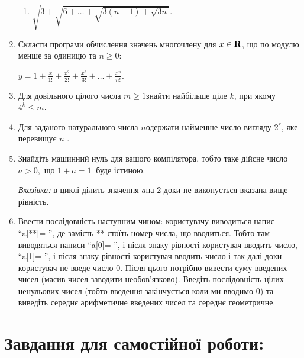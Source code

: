 \documentclass[a5paper,titlepage,openany,twoside,
]
{book_unv}%
\makeatletter
\newcommand{\xslalph}[1]{\expandafter\@xslalph\csname c@#1\endcsname}
\newcommand{\@xslalph}[1]{%
    \ifcase#1\or а\or б\or в\or г\or д\or e\or є\or ж\or з\or i%
    \or й\or к\or л\or м\or н\or о\or п\or р\or с\or т%
    \or у\or ф\or х\or ц\or ч\or ш\or ю\or я\or аа\or бб\or вв%
    \else\@ctrerr\fi%
}
\makeatother
\begin{document}
\begin{enumerate}
\begin{enumerate}[label=\xslalph*)]
\item
 \(\sqrt{3 + \sqrt{6 + \ldots + \sqrt{3(n - 1) + \sqrt{3n}}}}.\)

\end{enumerate}

\item
  Скласти програми обчислення значень многочлену для 
  \(x \in \bf{R}\), що по модулю менше за одиницю та
  \( n \geq 0\):

\(y = 1 + \frac{x}{1!} + \frac{x^{2}}{2!} + \frac{x^{3}}{3!} + \ldots + \frac{x^{n}}{n!} \).

\item
  Для довільного цілого числа \(m \geq 1\)знайти найбільше ціле \(k\),
  при якому \(4^{k} \leq m\).
\item
  Для заданого натурального числа \(n\)одержати найменше число вигляду
  \(2^{r}\), яке перевищує \(n\) .
\item
  Знайдіть машинний нуль для вашого компілятора, тобто таке дійсне число
  \(a > 0,\) що \(1 + a = 1\ \) буде істиною.

\emph{Вказівка:} в циклі ділить значення \(a\)на 2 доки не виконується
вказана вище рівність.

\item
  Ввести послідовність наступним чином: користувачу виводиться напис
  ``a{[}**{]}= '', де замість ** стоїть номер числа, що вводиться. Тобто
  там виводяться написи ``a{[}0{]}= '', і після знаку рівності
  користувач вводить число, ``a{[}1{]}= '', і після знаку рівності
  користувач вводить число і так далі доки користувач не введе число 0.
  Після цього потрібно вивести суму введених чисел (масив чисел заводити
  необов'язково). Введіть послідовність цілих ненульових чисел (тобто введення
  закінчується коли ми вводимо 0) та виведіть середнє арифметичне
  введених чисел та середнє геометричне.

\end{enumerate}

\section{Завдання для самостійної роботи:}
\end{document}
